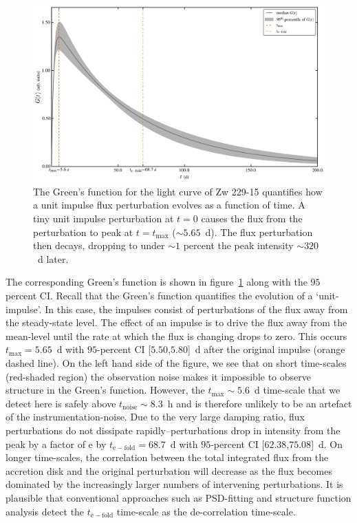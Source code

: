 \documentclass[a4paper,fleqn,usenatbib]{mnras}
\begin{document}
\begin{figure}
    \includegraphics[width=\textwidth]{images/Zw229-15_GF.jpg}
    \caption{The Green's function for the light curve of Zw 229-15 quantifies how a unit impulse flux perturbation evolves as a function of time. A tiny unit impulse perturbation at $t = 0$ causes the flux from the perturbation to peak at $t = t_{\mathrm{max}}$ ($\sim 5.65$~d). The flux perturbation then decays, dropping to under $\sim 1$ percent the peak intensity $\sim 320$~d later.}
    \label{fig:Zw229-15_GFunc}
\end{figure}

The corresponding Green's function is shown in figure~\ref{fig:Zw229-15_GFunc} along with the $95$ percent CI. Recall that the Green's function quantifies the evolution of a `unit-impulse'. In this case, the impulses consist of perturbations of the flux away from the steady-state level. The effect of an impulse is to drive the flux away from the mean-level until the rate at which the flux is changing drops to zero. This occurs $t_{\mathrm{max}} = 5.65$~d with $95$-percent CI [$5.50$,$5.80$]~d after the original impulse (orange dashed line). On the left hand side of the figure, we see that on short time-scales (red-shaded region) the observation noise makes it impossible to observe structure in the Green's function. However, the $t_{\mathrm{max}} \sim 5.6$~d time-scale that we detect here is safely above $t_{\mathrm{noise}} \sim 8.3$~h and is therefore unlikely to be an artefact of the instrumentation-noise. Due to the very large damping ratio, flux perturbations do not dissipate rapidly--perturbations drop in intensity from the peak by a factor of $\mathrm{e}$ by $t_{\mathrm{e-fold}} = 68.7$~d with $95$-percent CI [$62.38$,$75.08$]~d. On longer time-scales, the correlation between the total integrated flux from the accretion disk and the original perturbation will decrease as the flux becomes dominated by the increasingly larger numbers of intervening perturbations. It is plausible that conventional approaches such as PSD-fitting and structure function analysis detect the $t_{\mathrm{e-fold}}$ time-scale as the de-correlation time-scale. 
\end{document}
